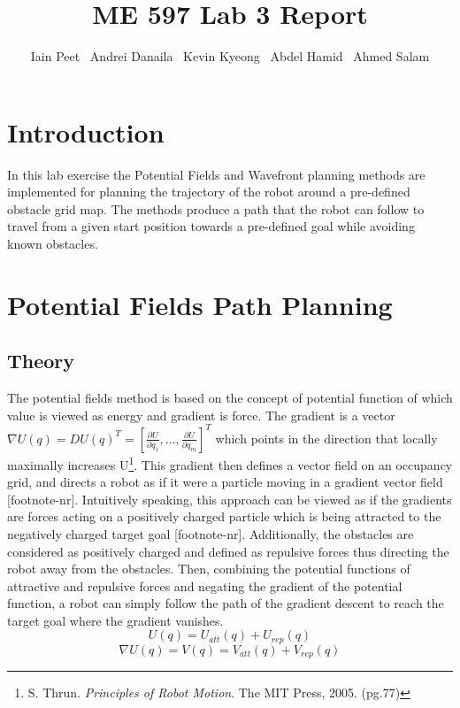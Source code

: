 \documentclass{article}
\newcommand{\tmtextit}[1]{{\itshape{#1}}}
\begin{document}
\title{ME 597 Lab 3 Report}\author{Iain Peet \ Andrei Danaila \ Kevin Kyeong \
Abdel Hamid \ Ahmed Salam}\maketitle

{\newpage}

\section*{Introduction}

In this lab exercise the Potential Fields and Wavefront planning methods are
implemented for planning the trajectory of the robot around a pre-defined
obstacle grid map. The methods produce a path that the robot can follow to
travel from a given start position towards a pre-defined goal while avoiding
known obstacles.

\section{Potential Fields Path Planning}

\subsection{Theory}

The potential fields method is based on the concept of potential function of
which value is viewed as energy and gradient is force. The gradient is a
vector $\nabla U (q) = DU (q)^T = [ \frac{\partial U}{\partial q_1}, ...,
\frac{\partial U}{\partial q_m}]^T$ which points in the direction that locally
maximally increases U{\footnote{S. Thrun. \tmtextit{Principles of Robot
Motion}. The MIT Press, 2005. (pg.77)}}. This gradient then defines a vector
field on an occupancy grid, and directs a robot as if it were a particle
moving in a gradient vector field [footnote-nr]. Intuitively speaking, this
approach can be viewed as if the gradients are forces acting on a positively
charged particle which is being attracted to the negatively charged target
goal [footnote-nr]. Additionally, the obstacles are considered as positively
charged and defined as repulsive forces thus directing the robot away from the
obstacles. Then, combining the potential functions of attractive and repulsive
forces and negating the gradient of the potential function, a robot can simply
follow the path of the gradient descent to reach the target goal where the
gradient vanishes.
\begin{equation}
  U (q) = U_{att} (q) + U_{rep} (q)
\end{equation}
\begin{equation}
  \nabla U (q) = V (q) = V_{att} (q) + V_{rep} (q)
\end{equation}
\end{document}
